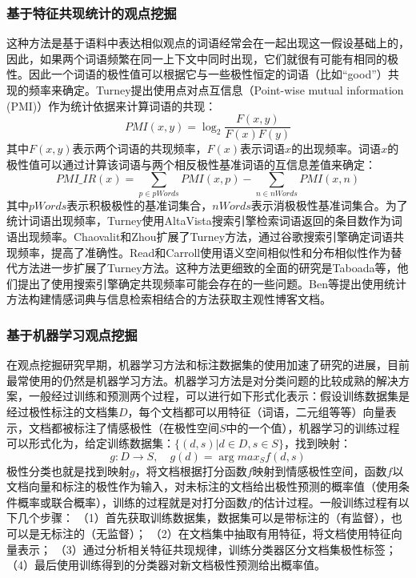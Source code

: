 \subsubsection{基于特征共现统计的观点挖掘}
这种方法是基于语料中表达相似观点的词语经常会在一起出现这一假设基础上的，因此，如果两个词语频繁在同一上下文中同时出现，它们就很有可能有相同的极性。因此一个词语的极性值可以根据它与一些极性恒定的词语（比如“good”）共现的频率来确定。Turney提出使用点对点互信息（Point-wise mutual information (PMI)）作为统计依据来计算词语的共现：
\begin{equation}
PMI(x,y)=\log_2\dfrac{F(x,y)}{F(x)F(y)}
\end{equation}
其中$ F(x,y) $表示两个词语的共现频率，$ F(x) $表示词语$ x $的出现频率。词语$ x $的极性值可以通过计算该词语与两个相反极性基准词语的互信息差值来确定：
\begin{equation}
PMI\_IR(x)=\sum_{p \in pWords}PMI(x,p)-\sum_{n \in nWords}PMI(x,n)
\end{equation}
其中$ pWords $表示积极极性的基准词集合，$ nWords $表示消极极性基准词集合。为了统计词语出现频率，Turney使用AltaVista搜索引擎检索词语返回的条目数作为词语出现频率。Chaovalit和Zhou扩展了Turney方法，通过谷歌搜索引擎确定词语共现频率，提高了准确性。Read和Carroll使用语义空间相似性和分布相似性作为替代方法进一步扩展了Turney方法。这种方法更细致的全面的研究是Taboada等，他们提出了使用搜索引擎确定共现频率可能会存在的一些问题。Ben等提出使用统计方法构建情感词典与信息检索相结合的方法获取主观性博客文档。

\subsubsection{基于机器学习观点挖掘}
在观点挖掘研究早期，机器学习方法和标注数据集的使用加速了研究的进展，目前最常使用的仍然是机器学习方法。机器学习方法是对分类问题的比较成熟的解决方案，一般经过训练和预测两个过程，可以进行如下形式化表示：假设训练数据集是经过极性标注的文档集$D$，每个文档都可以用特征（词语，二元组等等）向量表示，文档都被标注了情感极性（在极性空间$S$中的一个值），机器学习的训练过程可以形式化为，给定训练数据集：$ \{(d,s)|d \in D,s \in S\} $，找到映射：
\begin{equation}
g:D \rightarrow S,\quad g(d)=\arg max_S f(d,s)
\end{equation}
极性分类也就是找到映射$ g $，将文档根据打分函数$ f $映射到情感极性空间，函数$ f $以文档向量和标注的极性作为输入，对未标注的文档给出极性预测的概率值（使用条件概率或联合概率），训练的过程就是对打分函数$ f $的估计过程。一般训练过程有以下几个步骤：
（1）首先获取训练数据集，数据集可以是带标注的（有监督），也可以是无标注的（无监督）；
（2）在文档集中抽取有用特征，将文档使用特征向量表示；
（3）通过分析相关特征共现规律，训练分类器区分文档集极性标签；
（4）最后使用训练得到的分类器对新文档极性预测给出概率值。

